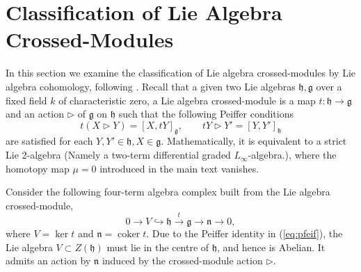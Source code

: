 \documentclass[onecolumn]{article}
\theoremstyle{theorem}
\theoremstyle{remark}
\theoremstyle{example}
\theoremstyle{definition}
\numberwithin{equation}{section}
\begin{document}





\appendix



\section{Classification of Lie Algebra Crossed-Modules}\label{algxmod}
In this section we examine the classification of Lie algebra crossed-modules by Lie algebra cohomology, following  \cite{Wag:2006}. Recall that a given two Lie algebras $\mathfrak{h},\mathfrak{g}$ over a { {fixed}} field $k$ of characteristic zero, a Lie algebra crossed-module is a map  $t:\mathfrak{h}\rightarrow\mathfrak{g}$ and an action $\rhd$ of $\mathfrak{g}$ on $\mathfrak{h}$ such that the following { {Peiffer conditions}}
\begin{equation}
    t(X\rhd Y) = [X,tY]_\mathfrak{g},\qquad  tY\rhd Y' = [Y,Y']_\mathfrak{h}\label{eq:pfeif}
\end{equation}
are satisfied for each $Y,Y'\in\mathfrak{h},X\in\mathfrak{g}$. Mathematically, it is equivalent to a { {strict}} Lie 2-algebra {(Namely a two-term differential graded $L_\infty$-algebra.)}, where the homotopy map $\mu=0$ introduced in the main text vanishes.

Consider the following four-term algebra complex built from the Lie algebra crossed-module, 
\begin{equation}
    0 \rightarrow V \hookrightarrow \mathfrak{h}\xrightarrow{t}\mathfrak{g}\rightarrow \mathfrak{n}\rightarrow 0,\label{eq:ext}
\end{equation}
where $V = \operatorname{ker}t$ and $\mathfrak{n}=\operatorname{coker}t$. Due to the Peiffer identity in  (\ref{eq:pfeif}), the Lie algebra $V\subset Z(\mathfrak{h})$ must lie in the centre of $\mathfrak{h}$, and hence is Abelian. It admits an action by $\mathfrak{n}$ induced by the crossed-module action $\rhd$.
\end{document}

